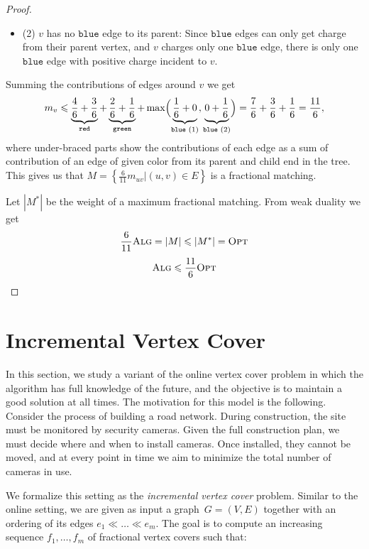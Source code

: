 \documentclass[a4paper,USenglish,cleveref,autoref,thm-restate,pdfa]{lipics-v2021}
\let\leq\leqslant
\newcommand{\cred}{\texttt{red}}
\newcommand{\cblue}{\texttt{blue}}
\newcommand{\cgreen}{\texttt{green}}
\newcommand{\alg}{\textsc{Alg}\xspace}
\newcommand{\opt}{\textsc{Opt}\xspace}
\begin{document}
\begin{proof}
\begin{itemize}
      \item (2) $v$ has no $\cblue$ edge to its parent: Since $\cblue$ edges can only get charge from their parent vertex, and $v$ charges only one $\cblue$ edge, there is only one $\cblue$ edge with positive charge incident to $v$. 
    \end{itemize}

  Summing the contributions of edges around $v$ we get
$$
    m_v \leq \underbrace{\frac{4}{6} + \frac{3}{6}}_{\text{$\cred$}} 
           + \underbrace{\frac{2}{6} + \frac{1}{6}}_{\text{$\cgreen$}} 
           + \max\Bigl(
            \underbrace{\frac{1}{6} + 0}_{\text{$\cblue$ (1)}},
            \underbrace{0 + \frac{1}{6}}_{\text{$\cblue$ (2)}}
            \Bigr)
           = \frac{7}{6} + \frac{3}{6} + \frac{1}{6} = \frac{11}{6},
$$ 
  where under-braced parts show the contributions of each edge as a sum of contribution of an edge of given color from its parent and child end in the tree.
  This gives us that $M = \left\{\frac{6}{11}m_{uv} | (u,v) \in E\right\}$ is a fractional matching.
  

  Let $|M^*|$ be the weight of a maximum fractional matching. From weak duality we get
  $$ \frac{6}{11}\alg = |M| \leq |M^*| = \opt$$
  $$ \alg \leq \frac{11}{6}\opt $$


\end{proof}

\section{Incremental Vertex Cover}

\newcommand{\twochild}{\ensuremath{\textsc{TwoChildRule}}\xspace}

In this section, we study a variant of the online vertex cover problem in which the algorithm has full knowledge of the future, and the objective is to maintain a good solution at all times.
The motivation for this model is the following. Consider the process of building a road network. During construction, the site must be monitored by security cameras. Given the full construction plan, we must decide where and when to install cameras. Once installed, they cannot be moved, and at every point in time we aim to minimize the total number of cameras in use.

We formalize this setting as the \emph{incremental vertex cover} problem.
Similar to the online setting, 
we are given as input a graph~$G=(V,E)$ together with an ordering of its edges $e_1 \ll \dots \ll e_m$. The goal is to compute an increasing sequence $f_1, \ldots, f_m$ of fractional vertex covers such that:
\end{document}
